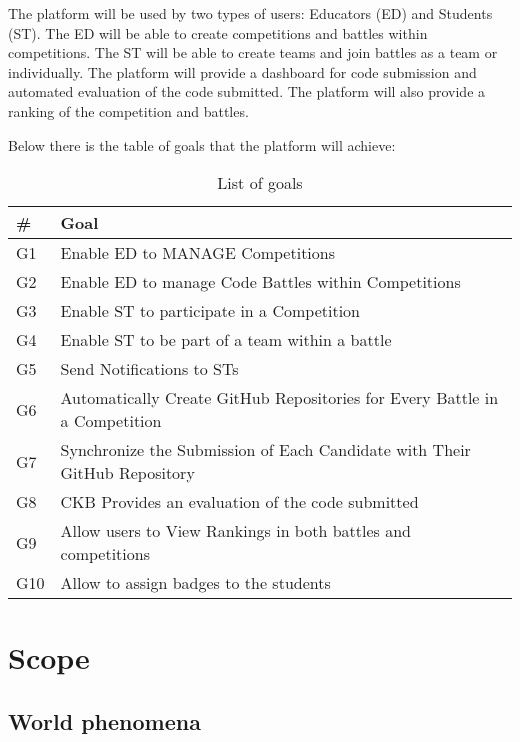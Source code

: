 The platform will be used by two types of users: Educators (ED) and Students (ST). The ED will be able to create competitions and battles within competitions. The ST will be able to create teams and join battles as a team or individually. The platform will provide a dashboard for code submission and automated evaluation of the code submitted. The platform will also provide a ranking of the competition and battles.

Below there is the table of goals that the platform will achieve:
\begin{table}[H]
  \begin{tabular}{|l|l|}










    \hline
    \textbf{\#} & \textbf{Goal}      \\
    \hline
    G1 & Enable ED to MANAGE Competitions \\
    \hline
    G2 & Enable ED to manage Code Battles within Competitions \\
    \hline
    G3 & Enable ST to participate in a Competition \\
    \hline
    G4 & Enable ST to be part of a team within a battle \\
    \hline
    G5 & Send Notifications to STs   \\
    \hline
    G6 & Automatically Create GitHub Repositories for Every Battle in a Competition    \\
    \hline
    G7 & Synchronize the Submission of Each Candidate with Their GitHub Repository   \\
    \hline
    G8 & CKB Provides an evaluation of the code submitted    \\
    \hline
    G9 & Allow users to View Rankings in both battles and competitions   \\
    \hline
    G10 & Allow to assign badges to the students    \\

    \hline


  \end{tabular}
  \caption{List of goals}
  \label{tab:goals}
\end{table}
\pagebreak
\section{Scope}
\label{s:Scope}%

\subsection{World phenomena}
\label{ss:world_phenomena}%

